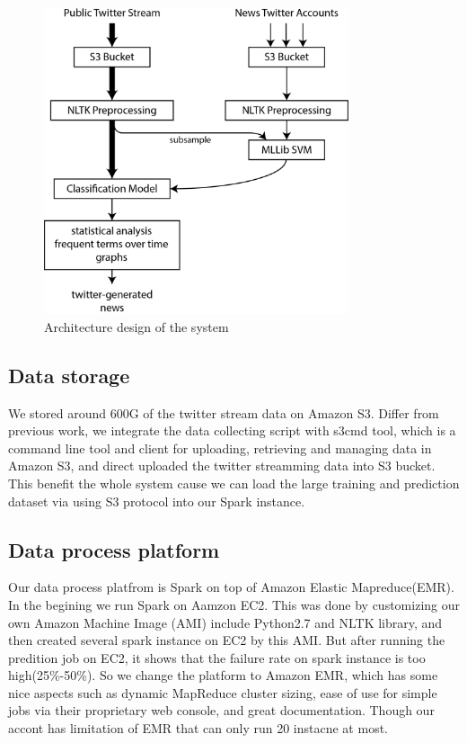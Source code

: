 \documentclass{llncs}
\begin{document}
\begin{figure}[H]
	\centering
	\includegraphics[width=0.8\textwidth]{images/system_arch.png} 
	\caption{Architecture design of the system}
	\label{fig:Architecture design of the system}
\end{figure}

\subsection{Data storage}
We stored around 600G of the twitter stream data on Amazon S3. Differ from previous work, we integrate the data collecting script with s3cmd tool, which is a command line tool and client for uploading, retrieving and managing data in Amazon S3\cite{s3cmd}, and direct uploaded the twitter streamming data into S3 bucket. This benefit the whole system cause we can load the large training and prediction dataset via using S3 protocol into our Spark instance. 

\subsection{Data process platform}
Our data process platfrom is Spark on top of Amazon Elastic Mapreduce(EMR). In the begining we run Spark on Aamzon EC2. This was done by customizing our own Amazon Machine Image (AMI) include Python2.7 and NLTK library, and then created several spark instance on EC2 by this AMI. But after running the predition job on EC2, it shows that the failure rate on spark instance is too high(25\%-50\%). So we change the platform to Amazon EMR, which has some nice aspects such as dynamic MapReduce cluster sizing, ease of use for simple jobs via their proprietary web console, and great documentation. Though our accont has limitation of EMR that can only run 20 instacne at most. 
\end{document}
